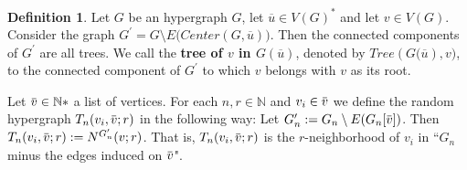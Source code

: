 \documentclass[12pt,notitlepage,a4paper]{article}
\theoremstyle{definition}
\newtheorem{definition}{Definition}[section]
\newcommand{\N}{\mathbb{N}}
\newcommand{\overbar}[1]{\mkern 1.5mu\overline{\mkern-1.5mu#1\mkern-1.5mu}\mkern 1.5mu}
\begin{document}
\begin{definition}
	Let $G$ be an hypergraph $G$, let $\overline{u}\in V(G)^*$
	and let $v\in V(G)$.
	Consider the graph $G^\prime= G\setminus 
	E\big(Center(G,\overline{u})\big)$. Then the connected components of
	$G^\prime$ are all trees. We call the \textbf{tree of $v$ in
	$G(\overline{u})$}, denoted by $Tree(G\big(\overline{u}),v\big)$,
	to the connected component of $G^\prime$ to which $v$ belongs
	with $v$ as its root. \par   
\end{definition}

Let $\overbar{v}\in \N*$ a list of vertices. For each $n,r\in \N$ and 
$v_i\in \overbar{v}$ we define the random hypergraph
$T_n(v_i,\overbar{v};r)$ in the following way: Let $G^\prime_n:=G_n \setminus
E(G_n[\overbar{v}])$. Then $T_n(v_i,\overbar{v};r):= N^{G^\prime_n}(v;r)$.
That is, $T_n(v_i,\overbar{v};r)$ is the $r$-neighborhood of $v_i$ in ``$G_n$
minus the edges induced on $\overbar{v}$". 
\end{document}
